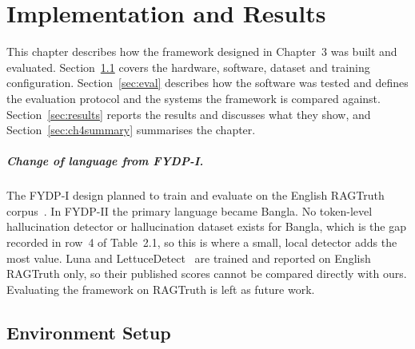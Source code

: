 %
%

\chapter{Implementation and Results}
\label{ch:implementation}

This chapter describes how the framework designed in Chapter~3 was built and
evaluated. Section~\ref{sec:env} covers the hardware, software, dataset and
training configuration. Section~\ref{sec:eval} describes how the software was
tested and defines the evaluation protocol and the systems the framework is
compared against. Section~\ref{sec:results} reports the results and discusses
what they show, and Section~\ref{sec:ch4summary} summarises the chapter.

\paragraph{Change of language from FYDP-I.} The FYDP-I design planned to train
and evaluate on the English RAGTruth corpus~\cite{ragtruth}. In FYDP-II the
primary language became Bangla. No token-level hallucination detector or
hallucination dataset exists for Bangla, which is the gap recorded in row~4 of
Table~2.1, so this is where a small, local detector adds the most value. Luna
and LettuceDetect~\cite{luna,lettucedetect} are trained and reported on English
RAGTruth only, so their published scores cannot be compared directly with ours.
Evaluating the framework on RAGTruth is left as future work.

\section{Environment Setup}
\label{sec:env}


